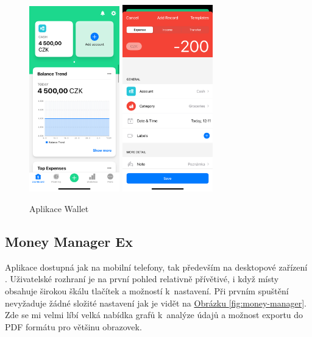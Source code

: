\documentclass[
  biblatex,
  figures=true,
  tables=false,
  glossaries,
  index
]{kidiplom}
\begin{document}
\begin{figure}
  \centering
  \includegraphics[width=0.35\textwidth]{images/wallet1.PNG}
    \hspace{10px}
    \includegraphics[width=0.35\textwidth]{images/wallet2.PNG}
  \caption{Aplikace Wallet}
  \label{fig:wallet}
\end{figure}

\subsection{Money Manager Ex}
Aplikace dostupná jak na mobilní telefony, tak především na desktopové zařízení \cite{money-manager}. Uživatelské rozhraní je na první pohled relativně přívětivé, i když místy obsahuje širokou škálu tlačítek a možností k~nastavení. Při prvním spuštění nevyžaduje žádné složité nastavení jak je vidět na \hyperref[fig:money-manager]{Obrázku \ref{fig:money-manager}}. Zde se mi velmi líbí velká nabídka grafů k~analýze údajů a možnost exportu do PDF formátu pro většinu obrazovek.
\end{document}
